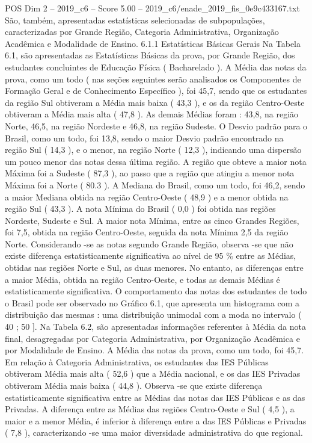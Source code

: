 \begin{textsample}{POS Dim 2 – 2019\_c6 – Score 5.00 – 2019\_c6/enade\_2019\_fis\_0e9c433167.txt}
São, também, apresentadas estatísticas selecionadas de subpopulações, caracterizadas por Grande Região, Categoria Administrativa, Organização Acadêmica e Modalidade de Ensino. 6.1.1 Estatísticas Básicas Gerais Na Tabela 6.1, são apresentadas as Estatísticas Básicas da prova, por Grande Região, dos estudantes concluintes de Educação Física ( Bacharelado ).
A Média das notas da prova, como um todo ( nas seções seguintes serão analisados os Componentes de Formação Geral e de Conhecimento Específico ), foi 45,7, sendo que os estudantes da região Sul obtiveram a Média mais baixa ( 43,3 ), e os da região Centro-Oeste obtiveram a Média mais alta ( 47,8 ).
As demais Médias foram : 43,8, na região Norte, 46,5, na região Nordeste e 46,8, na região Sudeste.
O Desvio padrão para o Brasil, como um todo, foi 13,8, sendo o maior Desvio padrão encontrado na região Sul ( 14,3 ), e o menor, na região Norte ( 12,3 ), indicando uma dispersão um pouco menor das notas dessa última região.
A região que obteve a maior nota Máxima foi a Sudeste ( 87,3 ), ao passo que a região que atingiu a menor nota Máxima foi a Norte ( 80.3 ).
A Mediana do Brasil, como um todo, foi 46,2, sendo a maior Mediana obtida na região Centro-Oeste ( 48,9 ) e a menor obtida na região Sul ( 43,3 ).
A nota Mínima do Brasil ( 0,0 ) foi obtida nas regiões Nordeste, Sudeste e Sul.
A maior nota Mínima, entre as cinco Grandes Regiões, foi 7,5, obtida na região Centro-Oeste, seguida da nota Mínima 2,5 da região Norte.
Considerando -se as notas segundo Grande Região, observa -se que não existe diferença estatisticamente significativa ao nível de 95 \% entre as Médias, obtidas nas regiões Norte e Sul, as duas menores.
No entanto, as diferenças entre a maior Média, obtida na região Centro-Oeste, e todas as demais Médias é estatisticamente significativa.
O comportamento das notas dos estudantes de todo o Brasil pode ser observado no Gráfico 6.1, que apresenta um histograma com a distribuição das mesmas : uma distribuição unimodal com a moda no intervalo ( 40 ; 50 ].
Na Tabela 6.2, são apresentadas informações referentes à Média da nota final, desagregadas por Categoria Administrativa, por Organização Acadêmica e por Modalidade de Ensino.
A Média das notas da prova, como um todo, foi 45,7.
Em relação à Categoria Administrativa, os estudantes das IES Públicas obtiveram Média mais alta ( 52,6 ) que a Média nacional, e os das IES Privadas obtiveram Média mais baixa ( 44,8 ).
Observa -se que existe diferença estatisticamente significativa entre as Médias das notas das IES Públicas e as das Privadas.
A diferença entre as Médias das regiões Centro-Oeste e Sul ( 4,5 ), a maior e a menor Média, é inferior à diferença entre a das IES Públicas e Privadas ( 7,8 ), caracterizando -se uma maior diversidade administrativa do que regional.

\end{textsample}
